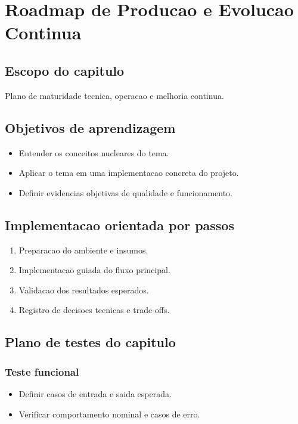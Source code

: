\chapter{Roadmap de Producao e Evolucao Continua}
\label{chap:roadmap_producao}

\section{Escopo do capitulo}
Plano de maturidade tecnica, operacao e melhoria continua.

\section{Objetivos de aprendizagem}
\begin{itemize}[leftmargin=*]
  \item Entender os conceitos nucleares do tema.
  \item Aplicar o tema em uma implementacao concreta do projeto.
  \item Definir evidencias objetivas de qualidade e funcionamento.
\end{itemize}

\section{Implementacao orientada por passos}
\begin{enumerate}[leftmargin=*]
  \item Preparacao do ambiente e insumos.
  \item Implementacao guiada do fluxo principal.
  \item Validacao dos resultados esperados.
  \item Registro de decisoes tecnicas e trade-offs.
\end{enumerate}

\section{Plano de testes do capitulo}
\subsection{Teste funcional}
\begin{itemize}[leftmargin=*]
  \item Definir casos de entrada e saida esperada.
  \item Verificar comportamento nominal e casos de erro.
\end{itemize}

